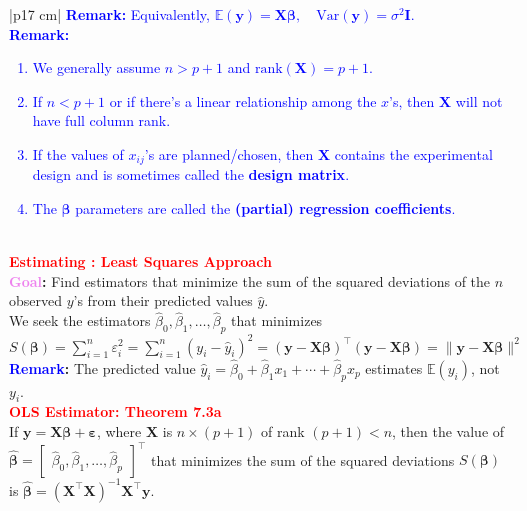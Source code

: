 \documentclass[a4paper,11pt]{article}
\begin{document}
\begin{longtable}{|p{17 cm}|}
\textcolor{blue}{\textbf{Remark:} Equivalently, $\mathbb{E}(\mathbf{y}) = \mathbf{X} \mathbf{\beta}, \quad \text{Var}(\mathbf{y}) = \sigma^2 \mathbf{I}.$} \\
\hline
\textcolor{blue}{\textbf{Remark:}} \\
\begin{minipage}{\linewidth} 
\vspace{-0.15cm}
\textcolor{blue}{\begin{enumerate}[noitemsep, topsep=0pt, partopsep=0pt, parsep=0pt]
    \item We generally assume $n > p+1$ and $\text{rank}(\mathbf{X}) = p+1$.
    \item If $n < p+1$ or if there’s a linear relationship among the $x$’s, then $\mathbf{X}$ will not have full column rank.
    \item If the values of $x_{ij}$’s are planned/chosen, then $\mathbf{X}$ contains the experimental design and is sometimes called the \textbf{design matrix}.
    \item The $\mathbf{\beta}$ parameters are called the \textbf{(partial) regression coefficients}. 
\end{enumerate}}
\end{minipage} \\
\hline  
\textcolor{red}{\textbf{Estimating : Least Squares Approach}} \\
\textbf{\textcolor{violet}{Goal}:} Find estimators that minimize the sum of the squared deviations of the $n$ observed $y$'s from their predicted values $\hat{y}$. \\
We seek the estimators $\hat{\beta}_0, \hat{\beta}_1, \dots, \hat{\beta}_p$ that minimizes
$S(\mathbf{\beta}) = \sum_{i=1}^{n} \varepsilon_i^2 = \sum_{i=1}^{n} (y_i - \hat{y}_i)^2 = (\mathbf{y} - \mathbf{X} \mathbf{\beta})^\top (\mathbf{y} - \mathbf{X} \mathbf{\beta}) = \|\mathbf{y} - \mathbf{X} \mathbf{\beta}\|^2$ \\
\textbf{\textcolor{blue}{Remark}:} The predicted value $\hat{y}_i = \hat{\beta}_0 + \hat{\beta}_1 x_1 + \cdots + \hat{\beta}_p x_p$ estimates $\mathbb{E}(y_i)$, not $y_i$. \\
\hline 
\textcolor{red}{\textbf{OLS Estimator: Theorem 7.3a}} \\
If \(\mathbf{y} = \mathbf{X} \boldsymbol{\beta} + \boldsymbol{\varepsilon}\), where \(\mathbf{X}\) is \(n \times (p+1)\) of rank \((p+1) < n\), then the value of \(\hat{\boldsymbol{\beta}} = \begin{bmatrix} \hat{\beta}_0, \hat{\beta}_1, \dots, \hat{\beta}_p \end{bmatrix}^{\top}\) that minimizes the sum of the squared deviations \(S(\boldsymbol{\beta})\) is \(\hat{\boldsymbol{\beta}} = \left( \mathbf{X}^{\top} \mathbf{X} \right)^{-1} \mathbf{X}^{\top} \mathbf{y}\). \\

\end{longtable}
\end{document}
